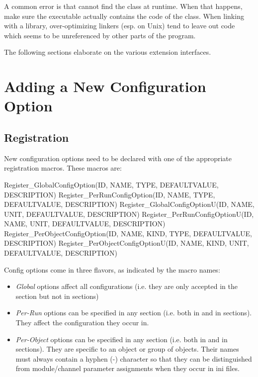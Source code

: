 \begin{note}
A common error is that {\opp} cannot find the class at runtime. When that
happens, make sure the executable actually contains the code of the class.
When linking with a library, over-optimizing linkers (esp. on Unix) tend to
leave out code which seems to be unreferenced by other parts of the
program.
\end{note}

The following sections elaborate on the various extension interfaces.


\section{Adding a New Configuration Option}
\label{sec:plugin-exts:configoption}

\subsection{Registration}
\label{sec:plugin-exts:configoption:registration}

New configuration options need to be declared with one of the appropriate
registration macros. These macros are:

\begin{cpp}
Register_GlobalConfigOption(ID, NAME, TYPE, DEFAULTVALUE, DESCRIPTION)
Register_PerRunConfigOption(ID, NAME, TYPE, DEFAULTVALUE, DESCRIPTION)
Register_GlobalConfigOptionU(ID, NAME, UNIT, DEFAULTVALUE, DESCRIPTION)
Register_PerRunConfigOptionU(ID, NAME, UNIT, DEFAULTVALUE, DESCRIPTION)
Register_PerObjectConfigOption(ID, NAME, KIND, TYPE, DEFAULTVALUE, DESCRIPTION)
Register_PerObjectConfigOptionU(ID, NAME, KIND, UNIT, DEFAULTVALUE, DESCRIPTION)
\end{cpp}

Config options come in three flavors, as indicated by the macro names:

\begin{itemize}
  \item \textit{Global} options affect all configurations (i.e. they are
      only accepted in the \ttt{[General]} section but not in
       sections)
  \item \textit{Per-Run} options can be specified in any section
      (i.e. both in \ttt{[General]} and in  sections).
      They affect the configuration they occur in.
  \item \textit{Per-Object} options can be specified in any section
      (i.e. both in \ttt{[General]} and in  sections).
      They are specific to an object or group of objects. Their names
      must always contain a hyphen (-) character so that they can be
      distinguished from module/channel parameter assignments when they
      occur in ini files.
\end{itemize}

